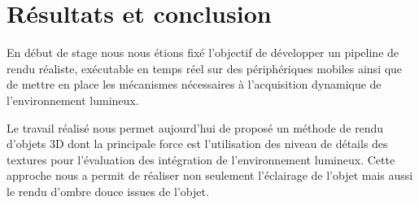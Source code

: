 \documentclass[10pt,a4paper,twoside, twocolumn]{report}
\begin{document}
\onecolumn


\chapter{Résultats et conclusion}


\iftwocolumn \begin{multicols}{2} \fi
En début de stage nous nous étions fixé l’objectif de développer un pipeline de rendu réaliste, exécutable en temps réel sur des périphériques mobiles ainsi que de mettre en place les mécanismes nécessaires à l’acquisition dynamique de l’environnement lumineux.

Le travail réalisé nous permet aujourd’hui de proposé un méthode de rendu d’objets 3D dont la principale force est l’utilisation des niveau de détails des textures pour l’évaluation des intégration de l’environnement lumineux. Cette approche nous a permit de réaliser non seulement l’éclairage de l’objet mais aussi le rendu d’ombre douce issues de l’objet.
\iftwocolumn \end{multicols} \fi
\end{document}
